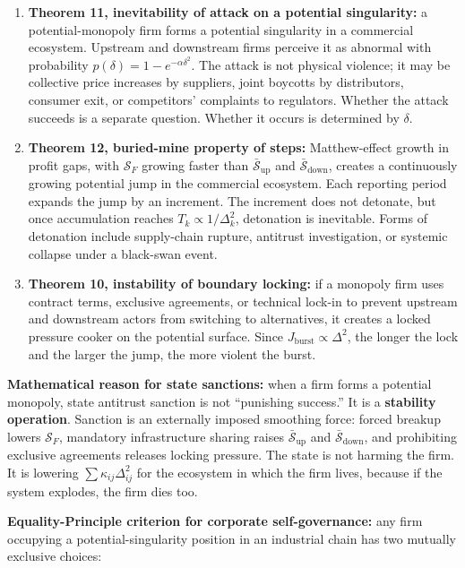 \documentclass[12pt,a4paper]{article}
\theoremstyle{remark}
\begin{document}
\begin{enumerate}[label=(\arabic*)]
    \item \textbf{Theorem 11, inevitability of attack on a potential singularity:} a potential-monopoly firm forms a potential singularity in a commercial ecosystem. Upstream and downstream firms perceive it as abnormal with probability $p(\delta) = 1 - e^{-\alpha\delta^2}$. The attack is not physical violence; it may be collective price increases by suppliers, joint boycotts by distributors, consumer exit, or competitors' complaints to regulators. Whether the attack succeeds is a separate question. Whether it occurs is determined by $\delta$.
    
    \item \textbf{Theorem 12, buried-mine property of steps:} Matthew-effect growth in profit gaps, with $\mathcal{S}_F$ growing faster than $\bar{\mathcal{S}}_{\text{up}}$ and $\bar{\mathcal{S}}_{\text{down}}$, creates a continuously growing potential jump in the commercial ecosystem. Each reporting period expands the jump by an increment. The increment does not detonate, but once accumulation reaches $T_k \propto 1/\Delta_k^2$, detonation is inevitable. Forms of detonation include supply-chain rupture, antitrust investigation, or systemic collapse under a black-swan event.
    
    \item \textbf{Theorem 10, instability of boundary locking:} if a monopoly firm uses contract terms, exclusive agreements, or technical lock-in to prevent upstream and downstream actors from switching to alternatives, it creates a locked pressure cooker on the potential surface. Since $J_{\text{burst}} \propto \Delta^2$, the longer the lock and the larger the jump, the more violent the burst.
\end{enumerate}

\textbf{Mathematical reason for state sanctions:} when a firm forms a potential monopoly, state antitrust sanction is not ``punishing success.'' It is a \textbf{stability operation}. Sanction is an externally imposed smoothing force: forced breakup lowers $\mathcal{S}_F$, mandatory infrastructure sharing raises $\bar{\mathcal{S}}_{\text{up}}$ and $\bar{\mathcal{S}}_{\text{down}}$, and prohibiting exclusive agreements releases locking pressure. The state is not harming the firm. It is lowering $\sum\kappa_{ij}\Delta_{ij}^2$ for the ecosystem in which the firm lives, because if the system explodes, the firm dies too.

\textbf{Equality-Principle criterion for corporate self-governance:} any firm occupying a potential-singularity position in an industrial chain has two mutually exclusive choices:
\end{document}
